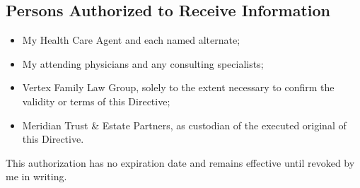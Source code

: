 \subsection{Persons Authorized to Receive Information}
\begin{itemize}[label=\faLock,leftmargin=1.6em,itemsep=2pt,topsep=2pt]
\item My Health Care Agent and each named alternate;
\item My attending physicians and any consulting specialists;
\item Vertex Family Law Group, solely to the extent necessary to confirm the validity or terms of this Directive;
\item Meridian Trust \& Estate Partners, as custodian of the executed original of this Directive.
\end{itemize}

This authorization has no expiration date and remains effective until revoked by me in writing.

